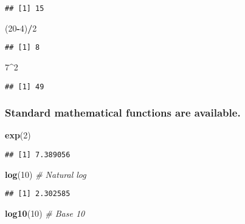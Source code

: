 \documentclass[]{article}
\newenvironment{Shaded}{\begin{snugshade}}{\end{snugshade}}
\newcommand{\KeywordTok}[1]{\textcolor[rgb]{0.13,0.29,0.53}{\textbf{#1}}}
\newcommand{\DecValTok}[1]{\textcolor[rgb]{0.00,0.00,0.81}{#1}}
\newcommand{\CommentTok}[1]{\textcolor[rgb]{0.56,0.35,0.01}{\textit{#1}}}
\newcommand{\OperatorTok}[1]{\textcolor[rgb]{0.81,0.36,0.00}{\textbf{#1}}}
\newcommand{\NormalTok}[1]{#1}
\begin{document}
\begin{verbatim}
## [1] 15
\end{verbatim}

\begin{Shaded}
\begin{Highlighting}[]
\NormalTok{(}\DecValTok{20}\OperatorTok{-}\DecValTok{4}\NormalTok{)}\OperatorTok{/}\DecValTok{2}
\end{Highlighting}
\end{Shaded}

\begin{verbatim}
## [1] 8
\end{verbatim}

\begin{Shaded}
\begin{Highlighting}[]
\DecValTok{7}\OperatorTok{^}\DecValTok{2}
\end{Highlighting}
\end{Shaded}

\begin{verbatim}
## [1] 49
\end{verbatim}

\subsubsection{Standard mathematical functions are
available.}\label{standard-mathematical-functions-are-available.}

\begin{Shaded}
\begin{Highlighting}[]
\KeywordTok{exp}\NormalTok{(}\DecValTok{2}\NormalTok{)}
\end{Highlighting}
\end{Shaded}

\begin{verbatim}
## [1] 7.389056
\end{verbatim}

\begin{Shaded}
\begin{Highlighting}[]
\KeywordTok{log}\NormalTok{(}\DecValTok{10}\NormalTok{) }\CommentTok{# Natural log}
\end{Highlighting}
\end{Shaded}

\begin{verbatim}
## [1] 2.302585
\end{verbatim}

\begin{Shaded}
\begin{Highlighting}[]
\KeywordTok{log10}\NormalTok{(}\DecValTok{10}\NormalTok{) }\CommentTok{# Base 10}
\end{Highlighting}
\end{Shaded}
\end{document}
